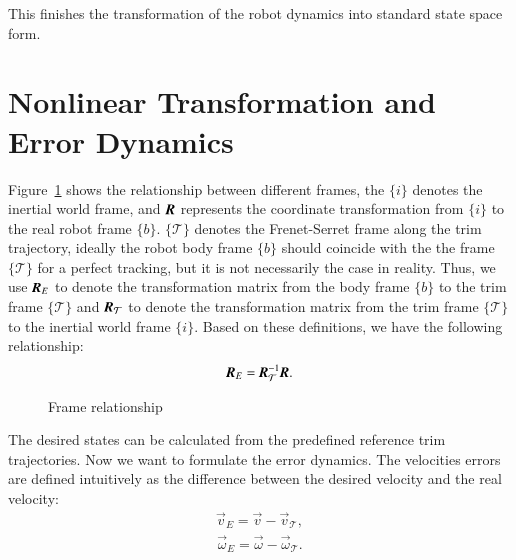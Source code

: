 This finishes the transformation of the robot dynamics into standard state space form.
\section{Nonlinear Transformation and Error Dynamics}
Figure~\ref{FIG:FrameRelationship} shows the relationship between different frames, the $\lbrace i \rbrace$ denotes the inertial world frame, and $\emph{\textbf{R}}$ represents the coordinate transformation from $\lbrace i \rbrace$ to the real robot frame $\lbrace b \rbrace$. $\lbrace \mathcal{T} \rbrace$ denotes the Frenet-Serret frame along the trim trajectory, ideally the robot body frame $\lbrace b \rbrace$ should coincide with the the frame $\lbrace \mathcal{T} \rbrace$ for a perfect tracking, but it is not necessarily the case in reality. Thus, we use $\emph{\textbf{R}}_{E}$ to denote the transformation matrix from the body frame $\lbrace b \rbrace$ to the trim frame $\lbrace \mathcal{T} \rbrace$ and $\emph{\textbf{R}}_{\mathcal{T}}$ to denote the transformation matrix from the trim frame $\lbrace \mathcal{T} \rbrace$ to the inertial world frame $\lbrace i \rbrace$. Based on these definitions, we have the following relationship:
\begin{align}
\emph{\textbf{R}}_{E}=\emph{\textbf{R}}^{-1}_{\mathcal{T}}\emph{\textbf{R}}.
\end{align}     
\begin{figure}
\center
{}
\caption{Frame relationship}	
\label{FIG:FrameRelationship}
\end{figure}
The desired states can be calculated from the predefined reference trim trajectories. Now we want to formulate the error dynamics. The velocities errors are defined intuitively as the difference between the desired velocity and the real velocity:
\begin{align}
\vec{v}_{E}=\vec{v}-\vec{v}_{\mathcal{T}}, \label{EQ:NLT1}
\end{align}
\begin{align}
\vec{\omega}_{E}=\vec{\omega}-\vec{\omega}_{\mathcal{T}}. \label{EQ:NLT2}
\end{align}
